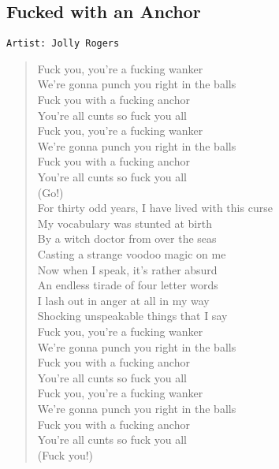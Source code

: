 \documentclass[11pt]{article}
\begin{document}
\subsection{Fucked with an Anchor}
\label{sec:orgfdcfd69}
\begin{verbatim}
Artist: Jolly Rogers
\end{verbatim}
\begin{verse}
Fuck you, you're a fucking wanker\\
We're gonna punch you right in the balls\\
Fuck you with a fucking anchor\\
You're all cunts so fuck you all\\
Fuck you, you're a fucking wanker\\
We're gonna punch you right in the balls\\
Fuck you with a fucking anchor\\
You're all cunts so fuck you all\\
\vspace*{1em}
(Go!)\\
\vspace*{1em}
For thirty odd years, I have lived with this curse\\
My vocabulary was stunted at birth\\
By a witch doctor from over the seas\\
Casting a strange voodoo magic on me\\
Now when I speak, it's rather absurd\\
An endless tirade of four letter words\\
I lash out in anger at all in my way\\
Shocking unspeakable things that I say\\
\vspace*{1em}
Fuck you, you're a fucking wanker\\
We're gonna punch you right in the balls\\
Fuck you with a fucking anchor\\
You're all cunts so fuck you all\\
Fuck you, you're a fucking wanker\\
We're gonna punch you right in the balls\\
Fuck you with a fucking anchor\\
You're all cunts so fuck you all\\
\vspace*{1em}
(Fuck you!)\\
\vspace*{1em}

\end{verse}
\end{document}

